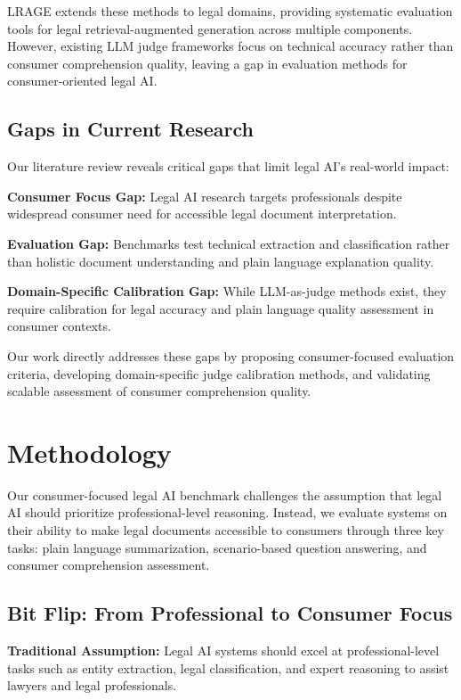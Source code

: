 \documentclass{article}
\begin{document}
LRAGE \cite{park2025lrage} extends these methods to legal domains, providing systematic evaluation tools for legal retrieval-augmented generation across multiple components. However, existing LLM judge frameworks focus on technical accuracy rather than consumer comprehension quality, leaving a gap in evaluation methods for consumer-oriented legal AI.

\subsection{Gaps in Current Research}

Our literature review reveals critical gaps that limit legal AI's real-world impact:

\textbf{Consumer Focus Gap:} Legal AI research targets professionals despite widespread consumer need for accessible legal document interpretation.

\textbf{Evaluation Gap:} Benchmarks test technical extraction and classification rather than holistic document understanding and plain language explanation quality.

\textbf{Domain-Specific Calibration Gap:} While LLM-as-judge methods exist, they require calibration for legal accuracy and plain language quality assessment in consumer contexts.

Our work directly addresses these gaps by proposing consumer-focused evaluation criteria, developing domain-specific judge calibration methods, and validating scalable assessment of consumer comprehension quality.

\section{Methodology}

Our consumer-focused legal AI benchmark challenges the assumption that legal AI should prioritize professional-level reasoning. Instead, we evaluate systems on their ability to make legal documents accessible to consumers through three key tasks: plain language summarization, scenario-based question answering, and consumer comprehension assessment.

\subsection{Bit Flip: From Professional to Consumer Focus}

\textbf{Traditional Assumption:} Legal AI systems should excel at professional-level tasks such as entity extraction, legal classification, and expert reasoning to assist lawyers and legal professionals.
\end{document}

